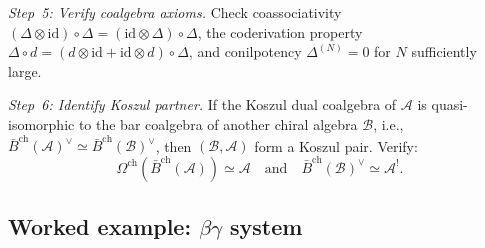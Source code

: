 \emph{Step~5: Verify coalgebra axioms.}
Check coassociativity $(\Delta \otimes \mathrm{id}) \circ \Delta = (\mathrm{id} \otimes \Delta) \circ \Delta$,
the coderivation property $\Delta \circ d = (d \otimes \mathrm{id} + \mathrm{id} \otimes d) \circ \Delta$,
and conilpotency $\Delta^{(N)} = 0$ for $N$ sufficiently large.

\emph{Step~6: Identify Koszul partner.}
If the Koszul dual coalgebra of $\mathcal{A}$ is quasi-isomorphic to the bar coalgebra of another chiral algebra $\mathcal{B}$, i.e.,
$\bar{B}^{\mathrm{ch}}(\mathcal{A})^{\vee} \simeq \bar{B}^{\mathrm{ch}}(\mathcal{B})^{\vee}$,
then $(\mathcal{B}, \mathcal{A})$ form a Koszul pair. Verify:
\[
\Omega^{\mathrm{ch}}(\bar{B}^{\mathrm{ch}}(\mathcal{A})) \simeq \mathcal{A}
\quad\text{and}\quad
\bar{B}^{\mathrm{ch}}(\mathcal{B})^{\vee} \simeq \mathcal{A}^!.
\]

\subsection{\texorpdfstring{Worked example: $\beta\gamma$ system}{Worked example: system}}


